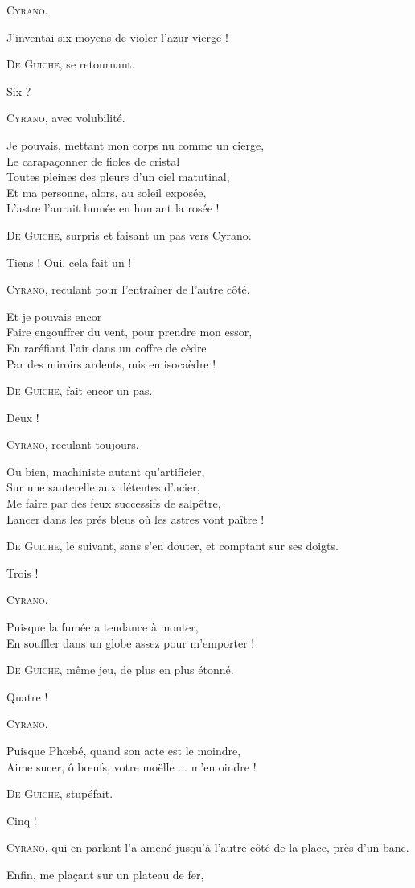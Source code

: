 \documentclass[11pt,a4paper,twoside]{book}
\begin{document}
\newcommand{\Cyr}[1]{\begin{center}\textsc{Cyrano}#1.\end{center}}
\newcommand{\DeG}[1]{\begin{center}\textsc{De Guiche}#1.\end{center}}
\thispagestyle{empty}
\begin{fquote}
\Cyr{}
J'inventai six moyens de violer l'azur vierge !\\
\DeG{, se retournant}
Six ?
\Cyr{, avec volubilité}
\hspace{.1\linewidth}Je pouvais, mettant mon corps nu comme un cierge,\\
Le carapaçonner de fioles de cristal\\
Toutes pleines des pleurs d'un ciel matutinal,\\
Et ma personne, alors, au soleil exposée,\\
L'astre l'aurait humée en humant la rosée !
\DeG{, surpris et faisant un pas vers Cyrano}
Tiens ! Oui, cela fait un !
\Cyr{, reculant pour l'entraîner de l'autre côté}
\hspace{.4\linewidth} Et je pouvais encor\\
Faire engouffrer du vent, pour prendre mon essor,\\
En raréfiant l'air dans un coffre de cèdre\\
Par des miroirs ardents, mis en isocaèdre !
\DeG{, fait encor un pas}
Deux !
\Cyr{, reculant toujours}
\hspace{.1\linewidth} Ou bien, machiniste autant qu'artificier,\\
Sur une sauterelle aux détentes d'acier,\\
Me faire par des feux successifs de salpêtre,\\
Lancer dans les prés bleus où les astres vont paître !
\DeG{, le suivant, sans s'en douter, et comptant sur ses doigts}
Trois !
\Cyr{}
\hspace{.1\linewidth} Puisque la fumée a tendance à monter,\\
En souffler dans un globe assez pour m'emporter !
\DeG{, même jeu, de plus en plus étonné}
Quatre !
\Cyr{}
\hspace{.1\linewidth} Puisque Ph\oe bé, quand son acte est le moindre,\\
Aime sucer, ô b\oe ufs, votre moëlle ... m'en oindre !
\DeG{, stupéfait}
Cinq !
\Cyr{, qui en parlant l'a amené jusqu'à l'autre côté de la place, près d'un banc}
\hspace{.1\linewidth} Enfin, me plaçant sur un plateau de fer,\\

\end{fquote}
\end{document}
